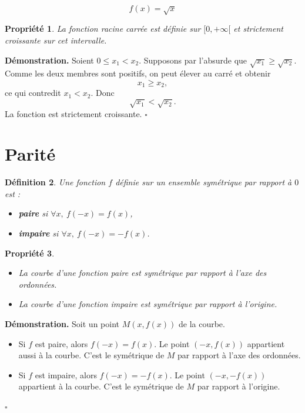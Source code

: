 \documentclass[11pt,a4paper]{article}
\newtheorem{definition}{Définition}[section]
\newtheorem{propriete}[definition]{Propriété}
\begin{document}
\[
f(x)=\sqrt{x}
\]

\begin{propriete}
La fonction racine carrée est définie sur \([0,+\infty[\) et strictement croissante sur cet intervalle.
\end{propriete}

\textbf{Démonstration.}  
Soient \(0\le x_1<x_2\). Supposons par l'absurde que \(\sqrt{x_1}\ge \sqrt{x_2}\).  
Comme les deux membres sont positifs, on peut élever au carré et obtenir
\[
x_1\ge x_2,
\]
ce qui contredit \(x_1<x_2\). Donc
\[
\sqrt{x_1}<\sqrt{x_2}.
\]
La fonction est strictement croissante. \(\square\)

\section{Parité}

\begin{definition}
Une fonction \(f\) définie sur un ensemble symétrique par rapport à \(0\) est :
\begin{itemize}
    \item \textbf{paire} si \(\forall x,\ f(-x)=f(x)\),
    \item \textbf{impaire} si \(\forall x,\ f(-x)=-f(x)\).
\end{itemize}
\end{definition}

\begin{propriete}
\begin{itemize}
    \item La courbe d'une fonction paire est symétrique par rapport à l'axe des ordonnées.
    \item La courbe d'une fonction impaire est symétrique par rapport à l'origine.
\end{itemize}
\end{propriete}

\textbf{Démonstration.}  
Soit un point \(M(x,f(x))\) de la courbe.

\begin{itemize}
    \item Si \(f\) est paire, alors \(f(-x)=f(x)\). Le point \((-x,f(x))\) appartient aussi à la courbe. C'est le symétrique de \(M\) par rapport à l'axe des ordonnées.
    \item Si \(f\) est impaire, alors \(f(-x)=-f(x)\). Le point \((-x,-f(x))\) appartient à la courbe. C'est le symétrique de \(M\) par rapport à l'origine.
\end{itemize}
\(\square\)
\end{document}
